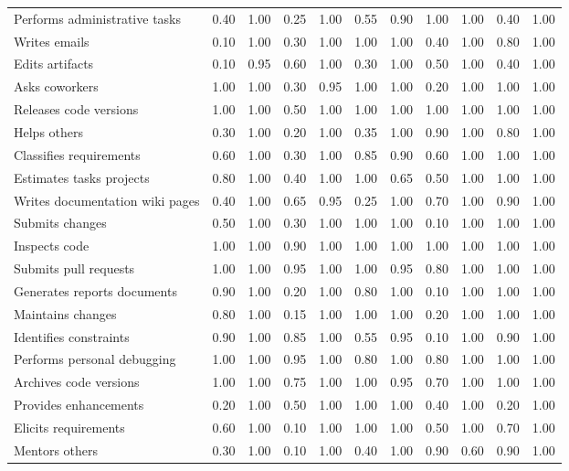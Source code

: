 \begin{tabular}{lrrrrrrrrrr}
Performs administrative tasks & 0.40 & 1.00 & 0.25 & 1.00 & 0.55 & 0.90 & 1.00 & 1.00 & 0.40 & 1.00 \\
Writes emails & 0.10 & 1.00 & 0.30 & 1.00 & 1.00 & 1.00 & 0.40 & 1.00 & 0.80 & 1.00 \\
Edits artifacts & 0.10 & 0.95 & 0.60 & 1.00 & 0.30 & 1.00 & 0.50 & 1.00 & 0.40 & 1.00 \\
Asks coworkers & 1.00 & 1.00 & 0.30 & 0.95 & 1.00 & 1.00 & 0.20 & 1.00 & 1.00 & 1.00 \\
Releases code versions & 1.00 & 1.00 & 0.50 & 1.00 & 1.00 & 1.00 & 1.00 & 1.00 & 1.00 & 1.00 \\
Helps others & 0.30 & 1.00 & 0.20 & 1.00 & 0.35 & 1.00 & 0.90 & 1.00 & 0.80 & 1.00 \\
Classifies requirements & 0.60 & 1.00 & 0.30 & 1.00 & 0.85 & 0.90 & 0.60 & 1.00 & 1.00 & 1.00 \\
Estimates tasks projects & 0.80 & 1.00 & 0.40 & 1.00 & 1.00 & 0.65 & 0.50 & 1.00 & 1.00 & 1.00 \\
Writes documentation wiki pages & 0.40 & 1.00 & 0.65 & 0.95 & 0.25 & 1.00 & 0.70 & 1.00 & 0.90 & 1.00 \\
Submits changes & 0.50 & 1.00 & 0.30 & 1.00 & 1.00 & 1.00 & 0.10 & 1.00 & 1.00 & 1.00 \\
Inspects code & 1.00 & 1.00 & 0.90 & 1.00 & 1.00 & 1.00 & 1.00 & 1.00 & 1.00 & 1.00 \\
Submits pull requests & 1.00 & 1.00 & 0.95 & 1.00 & 1.00 & 0.95 & 0.80 & 1.00 & 1.00 & 1.00 \\
Generates reports documents & 0.90 & 1.00 & 0.20 & 1.00 & 0.80 & 1.00 & 0.10 & 1.00 & 1.00 & 1.00 \\
Maintains changes & 0.80 & 1.00 & 0.15 & 1.00 & 1.00 & 1.00 & 0.20 & 1.00 & 1.00 & 1.00 \\
Identifies constraints & 0.90 & 1.00 & 0.85 & 1.00 & 0.55 & 0.95 & 0.10 & 1.00 & 0.90 & 1.00 \\
Performs personal debugging & 1.00 & 1.00 & 0.95 & 1.00 & 0.80 & 1.00 & 0.80 & 1.00 & 1.00 & 1.00 \\
Archives code versions & 1.00 & 1.00 & 0.75 & 1.00 & 1.00 & 0.95 & 0.70 & 1.00 & 1.00 & 1.00 \\
Provides enhancements & 0.20 & 1.00 & 0.50 & 1.00 & 1.00 & 1.00 & 0.40 & 1.00 & 0.20 & 1.00 \\
Elicits requirements & 0.60 & 1.00 & 0.10 & 1.00 & 1.00 & 1.00 & 0.50 & 1.00 & 0.70 & 1.00 \\
Mentors others & 0.30 & 1.00 & 0.10 & 1.00 & 0.40 & 1.00 & 0.90 & 0.60 & 0.90 & 1.00 \\

\end{tabular}
